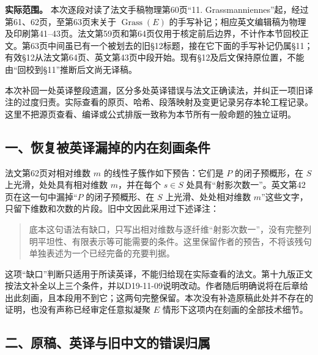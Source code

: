 
\noindent\textbf{实际范围。}
本次逐段对读了法文手稿物理第60页“11. Grassmanniennes”起，经过第61、62页，至第63页末关于 $\operatorname{Grass}(E)$ 的手写补记；相应英文编辑稿为物理及印刷第41--43页。法文第59页和第64页仅用于核定前后边界，不计作本节回校正文。第63页中间虽已有一个被划去的旧§12标题，接在它下面的手写补记仍属§11；有效§12从法文第64页、英文第43页中段开始。现有§12及后文保持原位置，不能由“回校到§11”推断后文尚无译稿。

本次补回一处英译整段遗漏，区分多处英译错误与法文正确读法，并纠正一项旧译注的过度归责。实际查看的原页、哈希、段落映射及变更记录另存本轮工程记录。这里不把源页查看、编译或公式排版一致称为本节所有一般命题的独立证明。

\subsection*{一、恢复被英译漏掉的内在刻画条件}

法文第62页对相对维数 $m$ 的线性子簇作如下预告：它们是 $P$ 的闭子预概形，在 $S$ 上光滑，处处具有相对维数 $m$，并在每个 $s\in S$ 处具有“射影次数一”。英文第42页在这一句中漏掉“$P$ 的闭子预概形、在 $S$ 上光滑、处处相对维数 $m$”这些文字，只留下维数和次数的片段。旧中文因此采用过下述译注：
\begin{quote}
底本这句语法有缺口，只写出相对维数与逐纤维“射影次数一”，没有完整列明平坦性、有限表示等可能需要的条件。这里保留作者的预告，不将该残句单独表述为一个已经完备的充要判据。
\end{quote}
这项“缺口”判断只适用于所读英译，不能归给现在实际查看的法文。第十九版正文按法文补全以上三个条件，并以D19-11-09说明改动。作者随后明确说将在后章给出此刻画，且本段用不到它；这两句完整保留。本次没有补造原稿此处并不存在的证明，也没有声称已经审定任意拟凝聚 $E$ 情形下这项内在刻画的全部技术细节。

\subsection*{二、原稿、英译与旧中文的错误归属}

